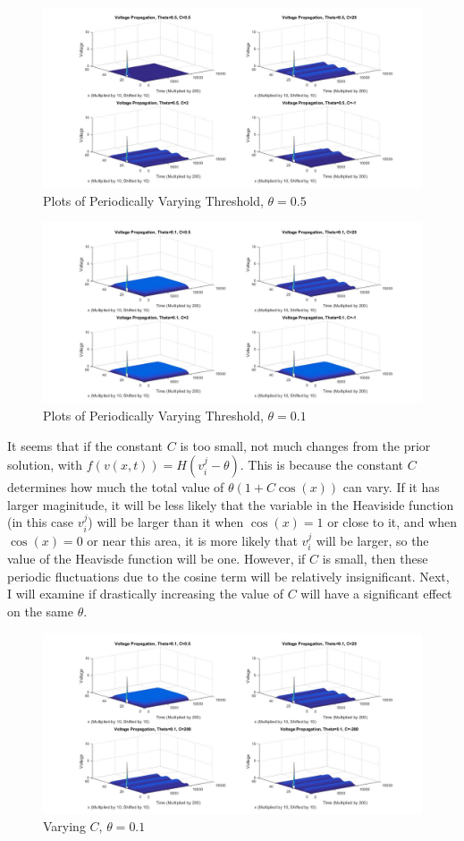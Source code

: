 \documentclass[12pt]{article}
\begin{document}
\begin{figure}[H]
  \includegraphics[width=\linewidth]{thetatwo3.jpg}
  \caption{Plots of Periodically Varying Threshold, $\theta=0.5$}
  \label{fig:sketch8}
\end{figure}
\begin{figure}[H]
  \includegraphics[width=\linewidth]{thetathree3.jpg}
  \caption{Plots of Periodically Varying Threshold, $\theta=0.1$}
  \label{fig:sketch9}
\end{figure}
It seems that if the constant $C$ is too small, not much changes from the prior solution, with $f(v(x,t))=H(v^j_i-\theta)$. This is because the constant $C$ determines how much the total value of $\theta(1+C\cos(x))$ can vary. If it has larger maginitude, it will be less likely that the variable in the Heaviside function (in this case $v_i^j$) will be larger than it when $\cos(x)=1$ or close to it, and when $\cos(x)=0$ or near this area, it is more likely that $v_i^j$ will be larger, so the value of the Heavisde function will be one. However, if $C$ is small, then these periodic fluctuations due to the cosine term will be relatively insignificant. Next, I will examine if drastically increasing the value of $C$ will have a significant effect on the same $\theta$.
\begin{figure}[H]
  \includegraphics[width=\linewidth]{plotsomething.jpg}
  \caption{Varying $C$, $\theta=0.1$}
  \label{fig:sketch10}
\end{figure}
\end{document}
